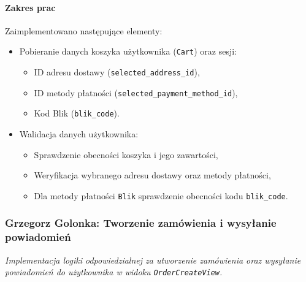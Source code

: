 \documentclass[12pt,a4paper,oneside]{article}
\theoremstyle{definition}
\numberwithin{equation}{section}
\begin{document}
\paragraph{Zakres prac}
Zaimplementowano następujące elementy:
\begin{itemize}
    \item Pobieranie danych koszyka użytkownika (\texttt{Cart}) oraz sesji:
    \begin{itemize}
        \item ID adresu dostawy (\texttt{selected\_address\_id}),
        \item ID metody płatności (\texttt{selected\_payment\_method\_id}),
        \item Kod Blik (\texttt{blik\_code}).
    \end{itemize}
    \item Walidacja danych użytkownika:
    \begin{itemize}
        \item Sprawdzenie obecności koszyka i jego zawartości,
        \item Weryfikacja wybranego adresu dostawy oraz metody płatności,
        \item Dla metody płatności \texttt{Blik} sprawdzenie obecności kodu \texttt{blik\_code}.
    \end{itemize}
\end{itemize}
%
%
\subsubsection{Grzegorz Golonka: Tworzenie zamówienia i wysyłanie powiadomień}
\label{section:1.3.27}
\textit{
Implementacja logiki odpowiedzialnej za utworzenie zamówienia oraz wysyłanie powiadomień do użytkownika w widoku \texttt{OrderCreateView}.
}
\end{document}
